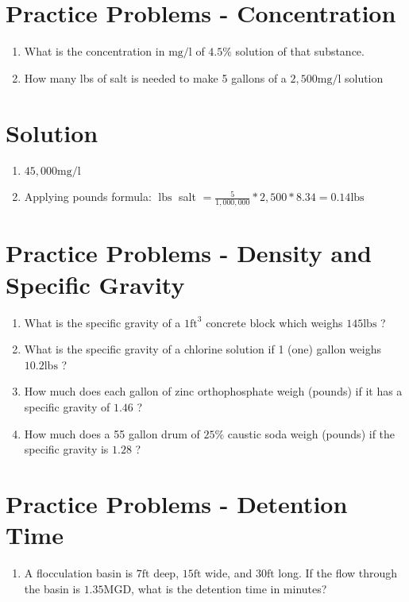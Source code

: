 \documentclass[10pt]{article}
\begin{document}
\begin{enumerate}
\begin{enumerate}
\section{Practice Problems - Concentration}
\begin{enumerate}
  \item What is the concentration in $\mathrm{mg} / \mathrm{l}$ of $4.5 \%$ solution of that substance.

  \item How many lbs of salt is needed to make 5 gallons of a $2,500 \mathrm{mg} / \mathrm{l}$ solution

\end{enumerate}

\section{Solution}
\begin{enumerate}
  \item $45,000 \mathrm{mg} / \mathrm{l}$

  \item Applying pounds formula: $\operatorname{lbs}$ salt $=\frac{5}{1,000,000} * 2,500 * 8.34=0.14 \mathrm{lbs}$

\end{enumerate}

\section{Practice Problems - Density and Specific Gravity}
\begin{enumerate}
  \item What is the specific gravity of a $1 \mathrm{ft}^{3}$ concrete block which weighs $145 \mathrm{lbs}$ ?

  \item What is the specific gravity of a chlorine solution if 1 (one) gallon weighs $10.2 \mathrm{lbs}$ ?

  \item How much does each gallon of zinc orthophosphate weigh (pounds) if it has a specific gravity of $1.46$ ?

  \item How much does a 55 gallon drum of $25 \%$ caustic soda weigh (pounds) if the specific gravity is $1.28$ ?

\end{enumerate}

\section{Practice Problems - Detention Time}
\begin{enumerate}
  \item A flocculation basin is $7 \mathrm{ft}$ deep, $15 \mathrm{ft}$ wide, and $30 \mathrm{ft}$ long. If the flow through the basin is $1.35 \mathrm{MGD}$, what is the detention time in minutes?


\end{enumerate}
\end{enumerate}
\end{enumerate}
\end{document}
